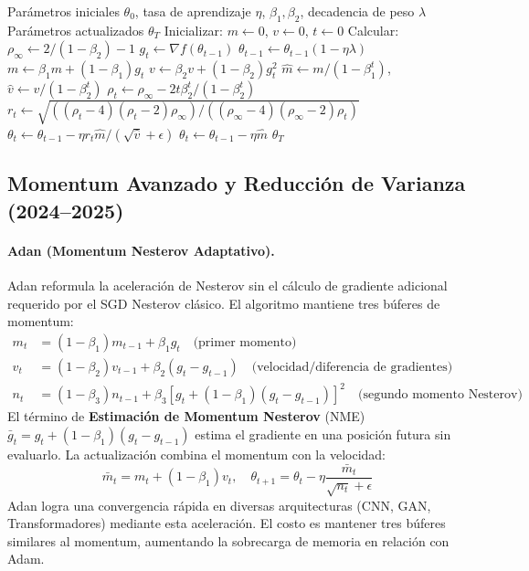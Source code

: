 \begin{algorithm}[H]
\caption{RAdam (Adam Rectificado)}
\label{alg:radam}
\begin{algorithmic}[1]
\Require Parámetros iniciales $\theta_0$, tasa de aprendizaje $\eta$, $\beta_1, \beta_2$, decadencia de peso $\lambda$
\Ensure Parámetros actualizados $\theta_T$
\State Inicializar: $m \gets 0$, $v \gets 0$, $t \gets 0$
\State Calcular: $\rho_\infty \gets 2/(1-\beta_2) - 1$
    \State $g_t \gets \nabla f(\theta_{t-1})$
        \State $\theta_{t-1} \gets \theta_{t-1}(1 - \eta\lambda)$
    \EndIf
    \State $m \gets \beta_1 m + (1-\beta_1) g_t$
    \State $v \gets \beta_2 v + (1-\beta_2) g_t^2$
    \State $\hat{m} \gets m/(1-\beta_1^t)$, $\hat{v} \gets v/(1-\beta_2^t)$
    \State $\rho_t \gets \rho_\infty - 2t \beta_2^t / (1 - \beta_2^t)$
        \State $r_t \gets \sqrt{((\rho_t-4)(\rho_t-2)\rho_\infty) / ((\rho_\infty-4)(\rho_\infty-2)\rho_t)}$
        \State $\theta_t \gets \theta_{t-1} - \eta r_t \hat{m} / (\sqrt{\hat{v}} + \epsilon)$
    \Else
        \State $\theta_t \gets \theta_{t-1} - \eta \hat{m}$ 
    \EndIf
\EndFor
\Return $\theta_T$
\end{algorithmic}
\end{algorithm}

\subsection{Momentum Avanzado y Reducción de Varianza (2024--2025)}
\paragraph{Adan (Momentum Nesterov Adaptativo).}
Adan reformula la aceleración de Nesterov sin el cálculo de gradiente adicional requerido por el SGD Nesterov clásico. El algoritmo mantiene tres búferes de momentum:
\begin{align}
m_t &= (1-\beta_1)m_{t-1} + \beta_1 g_t \quad\text{(primer momento)} \\
v_t &= (1-\beta_2)v_{t-1} + \beta_2(g_t - g_{t-1}) \quad\text{(velocidad/diferencia de gradientes)} \\
n_t &= (1-\beta_3)n_{t-1} + \beta_3[g_t + (1-\beta_1)(g_t-g_{t-1})]^2 \quad\text{(segundo momento Nesterov)}
\end{align}
El término de \textbf{Estimación de Momentum Nesterov} (NME) $\bar{g}_t = g_t + (1-\beta_1)(g_t-g_{t-1})$ estima el gradiente en una posición futura sin evaluarlo. La actualización combina el momentum con la velocidad:
\[\bar{m}_t = m_t + (1-\beta_1)v_t, \quad \theta_{t+1} = \theta_t - \eta\frac{\bar{m}_t}{\sqrt{n_t}+\epsilon}\]
Adan logra una convergencia rápida en diversas arquitecturas (CNN, GAN, Transformadores) mediante esta aceleración. El costo es mantener tres búferes similares al momentum, aumentando la sobrecarga de memoria en relación con Adam.

